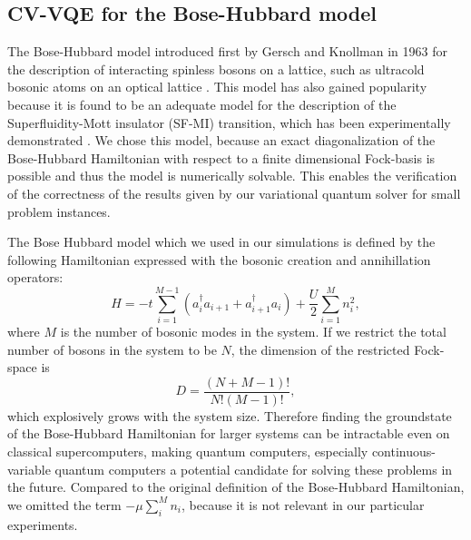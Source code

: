 \documentclass[12pt, a4paper,  nobibnotes]{article}
\begin{document}
\subsection{CV-VQE for the Bose-Hubbard model}
The Bose-Hubbard model introduced first by Gersch and Knollman in 1963 for the description of interacting spinless bosons on a lattice, such as ultracold bosonic atoms on an optical lattice
\cite{BoseHubbardOriginal,ColdAtomtHubbard}. This model has also gained popularity because it is found to be an adequate model for the description of the Superfluidity-Mott insulator (SF-MI) transition, which has been experimentally demonstrated \cite{SuperfluidityMottTransition,Greiner2002}.
We chose this model, because an exact diagonalization of the Bose-Hubbard Hamiltonian with respect to a finite dimensional Fock-basis is possible and thus the model is numerically solvable. This enables the verification of the correctness of the results given by our variational quantum solver for small problem instances.
\par
The Bose Hubbard model which we used in our simulations is defined by the following Hamiltonian expressed with the bosonic creation and annihillation operators:
\begin{equation}
     H = -t\sum\limits_{i=1}^{M-1}( a_{i}^\dagger  a_{i+1} +  a_{i+1}^\dagger  a_{i}) + \frac{U}{2}\sum\limits_{i=1}^{M} n_i^2 ,
     \label{eq:bhhamiltonian}
\end{equation}
where $M$ is the number of bosonic modes in the system. If we restrict the total number of bosons in the system to be $N$, the dimension of the restricted Fock-space is
\begin{equation}
    D = \frac{(N+M-1)!}{N!(M-1)!},
\end{equation}
which explosively grows with the system size. Therefore finding the groundstate of the Bose-Hubbard Hamiltonian for larger systems can be intractable even on classical supercomputers, making quantum computers, especially continuous-variable quantum computers a potential candidate for solving these problems in the future.
Compared to the original definition of the Bose-Hubbard Hamiltonian, we omitted the term $-\mu\sum\limits_{i}^{M} n_i$, because it is not relevant in our particular experiments.
\end{document}
